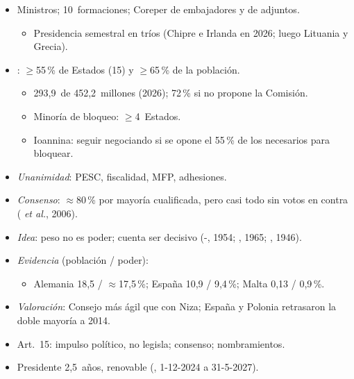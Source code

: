 \documentclass{article}
\begin{document}
\begin{columnas}
\begin{itemize}
\item Ministros; 10~formaciones; Coreper de embajadores y de adjuntos.
  \begin{itemize}
  \item Presidencia semestral en tríos (Chipre e Irlanda en 2026; luego Lituania y Grecia).
  \end{itemize}
\item {}: $\geq$55\,\% de Estados (15) y $\geq$65\,\% de la población.
  \begin{itemize}
  \item 293,9~de 452,2~millones (2026); 72\,\% si no propone la Comisión.
  \item Minoría de bloqueo: $\geq$4~Estados.
  \item Ioannina: seguir negociando si se opone el 55\,\% de los necesarios para bloquear.
  \end{itemize}
\item \emph{Unanimidad}: PESC, fiscalidad, MFP, adhesiones.
\item \emph{Consenso}: $\approx$80\,\% por mayoría cualificada, pero casi todo sin votos en contra ( \emph{et al.}, 2006).
\end{itemize}
\begin{itemize}
\item \emph{Idea}: peso no es poder; cuenta ser decisivo (-, 1954; , 1965; , 1946).
\item \emph{Evidencia} (población / poder):
  \begin{itemize}
  \item Alemania 18,5 / $\approx$17,5\,\%; España 10,9 / 9,4\,\%; Malta 0,13 / 0,9\,\%.
  \end{itemize}
\item \emph{Valoración}: Consejo más ágil que con Niza; España y Polonia retrasaron la doble mayoría a 2014.
\end{itemize}

\begin{itemize}
\item Art.~15: impulso político, no legisla; consenso; nombramientos.
\item Presidente 2,5~años, renovable (, 1-12-2024 a 31-5-2027).
\end{itemize}


\end{columnas}
\end{document}
